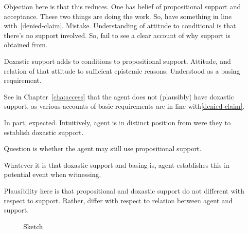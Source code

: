 \begin{note}[Objection]
  Objection here is that this reduces.
  One has belief of propositional support and acceptance.
  These two things are doing the work.
  So, have something in line with~\ref{denied-claim}.
  Mistake.
  Understanding of attitude to conditional is that there's no support involved.
  So, fail to see a clear account of why support is obtained from.
\end{note}

\begin{note}
  Doxastic support adds to conditions to propositional support.
  Attitude, and relation of that attitude to sufficient epistemic reasons.
  Understood as a basing requirement.

  See in Chapter~\ref{cha:access} that the agent does not (plausibly) have doxastic support, as various accounts of basic requirements are in line with\ref{denied-claim}.

  In part, expected.
  Intuitively, agent is in distinct position from were they to establish doxastic support.

  Question is whether the agent may still use propositional support.
\end{note}

\begin{note}
  Whatever it is that doxastic support and basing is, agent establishes this in potential event when witnessing.

  Plausibility here is that propositional and doxastic support do not different with respect to support.
  Rather, differ with respect to relation between agent and support.
\end{note}

\begin{note}
  
\end{note}

\begin{figure}[h!]
  \centering
  \caption{Sketch}
\end{figure}


